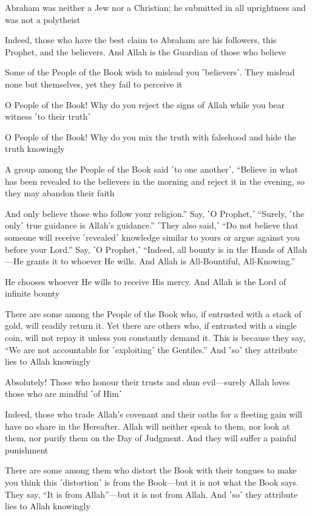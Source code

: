 Abraham was neither a Jew nor a Christian; he submitted in all uprightness and was not a polytheist

Indeed, those who have the best claim to Abraham are his followers, this Prophet, and the believers. And Allah is the Guardian of those who believe

Some of the People of the Book wish to mislead you ˹believers˺. They mislead none but themselves, yet they fail to perceive it

O People of the Book! Why do you reject the signs of Allah while you bear witness ˹to their truth˺

O People of the Book! Why do you mix the truth with falsehood and hide the truth knowingly

A group among the People of the Book said ˹to one another˺, “Believe in what has been revealed to the believers in the morning and reject it in the evening, so they may abandon their faith

And only believe those who follow your religion.” Say, ˹O Prophet,˺ “Surely, ˹the only˺ true guidance is Allah’s guidance.” ˹They also said,˺ “Do not believe that someone will receive ˹revealed˺ knowledge similar to yours or argue against you before your Lord.” Say, ˹O Prophet,˺ “Indeed, all bounty is in the Hands of Allah—He grants it to whoever He wills. And Allah is All-Bountiful, All-Knowing.”

He chooses whoever He wills to receive His mercy. And Allah is the Lord of infinite bounty

There are some among the People of the Book who, if entrusted with a stack of gold, will readily return it. Yet there are others who, if entrusted with a single coin, will not repay it unless you constantly demand it. This is because they say, “We are not accountable for ˹exploiting˺ the Gentiles.” And ˹so˺ they attribute lies to Allah knowingly

Absolutely! Those who honour their trusts and shun evil—surely Allah loves those who are mindful ˹of Him˺

Indeed, those who trade Allah’s covenant and their oaths for a fleeting gain will have no share in the Hereafter. Allah will neither speak to them, nor look at them, nor purify them on the Day of Judgment. And they will suffer a painful punishment

There are some among them who distort the Book with their tongues to make you think this ˹distortion˺ is from the Book—but it is not what the Book says. They say, “It is from Allah”—but it is not from Allah. And ˹so˺ they attribute lies to Allah knowingly

